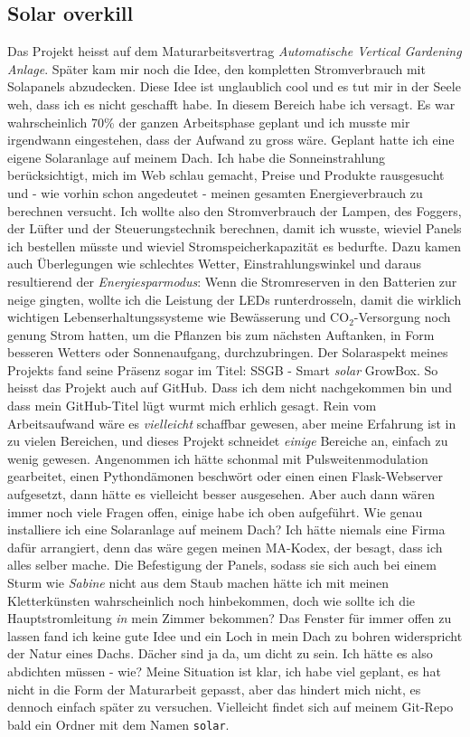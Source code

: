 \documentclass[12pt,titlepage,a4paper]{article}
\begin{document}
\subsection{Solar overkill}
Das Projekt heisst auf dem Maturarbeitsvertrag \textit{Automatische Vertical Gardening Anlage}. Später kam mir noch die Idee, den kompletten Stromverbrauch mit Solapanels abzudecken. Diese Idee ist unglaublich cool und es tut mir in der Seele weh, dass ich es nicht geschafft habe. In diesem Bereich habe ich versagt. Es war wahrscheinlich 70\% der ganzen Arbeitsphase geplant und ich musste mir irgendwann eingestehen, dass der Aufwand zu gross wäre. Geplant hatte ich eine eigene Solaranlage auf meinem Dach. Ich habe die Sonneinstrahlung berücksichtigt, mich im Web schlau gemacht, Preise und Produkte rausgesucht und - wie vorhin schon angedeutet - meinen gesamten Energieverbrauch zu berechnen versucht. Ich wollte also den Stromverbrauch der Lampen, des Foggers, der Lüfter und der Steuerungstechnik berechnen, damit ich wusste, wieviel Panels ich bestellen müsste und wieviel Stromspeicherkapazität es bedurfte. Dazu kamen auch Überlegungen wie schlechtes Wetter, Einstrahlungswinkel und daraus resultierend der \textit{Energiesparmodus}: Wenn die Stromreserven in den Batterien zur neige gingten, wollte ich die Leistung der LEDs runterdrosseln, damit die wirklich wichtigen Lebenserhaltungssysteme wie Bewässerung und CO$ _{2} $-Versorgung noch genung Strom hatten, um die Pflanzen bis zum nächsten Auftanken, in Form besseren Wetters oder Sonnenaufgang, durchzubringen. Der Solaraspekt meines Projekts fand seine Präsenz sogar im Titel: SSGB - Smart \textit{solar} GrowBox. So heisst das Projekt auch auf GitHub. Dass ich dem nicht nachgekommen bin und dass mein GitHub-Titel lügt wurmt mich erhlich gesagt. Rein vom Arbeitsaufwand wäre es \textit{vielleicht} schaffbar gewesen, aber meine Erfahrung ist in zu vielen Bereichen, und dieses Projekt schneidet \textit{einige} Bereiche an, einfach zu wenig gewesen. Angenommen ich hätte schonmal mit Pulsweitenmodulation gearbeitet, einen Pythondämonen beschwört oder einen einen Flask-Webserver aufgesetzt, dann hätte es vielleicht besser ausgesehen. Aber auch dann wären immer noch viele Fragen offen, einige habe ich oben aufgeführt. Wie genau installiere ich eine Solaranlage auf meinem Dach? Ich hätte niemals eine Firma dafür arrangiert, denn das wäre gegen meinen MA-Kodex, der besagt, dass ich alles selber mache. Die Befestigung der Panels, sodass sie sich auch bei einem Sturm wie \textit{Sabine} nicht  aus dem Staub machen hätte ich mit meinen Kletterkünsten wahrscheinlich noch hinbekommen, doch wie sollte ich die Hauptstromleitung \textit{in} mein Zimmer bekommen? Das Fenster für immer offen zu lassen fand ich keine gute Idee und ein Loch in mein Dach zu bohren widerspricht der Natur eines Dachs. Dächer sind ja da, um dicht zu sein. Ich hätte es also abdichten müssen - wie? Meine Situation ist klar, ich habe viel geplant, es hat nicht in die Form der Maturarbeit gepasst, aber das hindert mich nicht, es dennoch einfach später zu versuchen. Vielleicht findet sich auf meinem Git-Repo bald ein Ordner mit dem Namen \verb/solar/.
\end{document}
